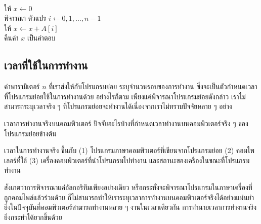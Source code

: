 \begin{algt}
\label{alg:array-sum2}
\\
\hspace*{0.2in} ให้ $x\leftarrow 0$\\
\hspace*{0.2in} พิจารณา ตัวแปร $i\leftarrow 0,1,\ldots,n-1$\\
\hspace*{0.2in}\hspace*{0.2in} ให้ $x \leftarrow x + A[i]$\\
\hspace*{0.2in} คืน{\wbr}ค่า $x$ เป็น{\wbr}คำตอบ{\wbr}
\end{algt}

\subsection{เวลา{\wbr}ที่{\wbr}ใช้{\wbr}ใน{\wbr}การ{\wbr}ทำงาน}

ค่า{\wbr}พารามิเตอร์ $n$ ที่{\wbr}เรา{\wbr}ส่ง{\wbr}ให้{\wbr}กับ{\wbr}โปรแกรมย่อย ระบุ{\wbr}จำนวน{\wbr}รอบ{\wbr}ของ{\wbr}การ{\wbr}ทำงาน{\wbr}
ซึ่ง{\wbr}จะ{\wbr}เป็น{\wbr}ตัวกำหนด{\wbr}เวลา{\wbr}ที่{\wbr}โปรแกรมย่อย{\wbr}ใช้{\wbr}ใน{\wbr}การ{\wbr}ทำงาน{\wbr}ด้วย อย่างไรก็ตาม{\wbr}
เพียงแค่{\wbr}พิจารณา{\wbr}โปรแกรมย่อย{\wbr}ดังกล่าว เรา{\wbr}ไม่{\wbr}สามารถ{\wbr}ระบุ{\wbr}เวลาจริง ๆ
ที่{\wbr}โปรแกรมย่อย{\wbr}จะ{\wbr}ทำงาน{\wbr}ได้{\wbr}เนื่องจาก{\wbr}เรา{\wbr}ไม่{\wbr}ทราบ{\wbr}ปัจจัย{\wbr}หลาย ๆ อย่าง{\wbr}

\begin{quiz}{เวลา{\wbr}การ{\wbr}ทำงาน{\wbr}จริง{\wbr}บน{\wbr}คอมพิวเตอร์}
ปัจจัย{\wbr}อะไร{\wbr}บ้าง{\wbr}ที่{\wbr}กำหนด{\wbr}เวลา{\wbr}ทำงาน{\wbr}บน{\wbr}คอมพิวเตอร์{\wbr}จริง ๆ ของ{\wbr}โปรแกรมย่อย{\wbr}ข้างต้น{\wbr}
\end{quiz}
\begin{quizans}
เวลา{\wbr}ใน{\wbr}การ{\wbr}ทำงาน{\wbr}จริง ขึ้น{\wbr}กับ (1) โปรแกรม{\wbr}ภาษาคอมพิวเตอร์{\wbr}ที่{\wbr}เขียน{\wbr}จาก{\wbr}โปรแกรมย่อย (2)
คอม{\wbr}ไพ{\wbr}เลอร์{\wbr}ที่{\wbr}ใช้ (3) เครื่อง{\wbr}คอมพิวเตอร์{\wbr}ที่{\wbr}นำ{\wbr}โปรแกรม{\wbr}ไป{\wbr}ทำงาน{\wbr}
และ{\wbr}สถานะ{\wbr}ของ{\wbr}เครื่องใน{\wbr}ขณะที่{\wbr}โปรแกรม{\wbr}ทำงาน  
\end{quizans}

สังเกต{\wbr}ว่า{\wbr}การ{\wbr}พิจารณา{\wbr}แค่{\wbr}อัล{\wbr}กอ{\wbr}ริ{\wbr}ทึม{\wbr}เพียง{\wbr}อย่างเดียว{\wbr}
หรือ{\wbr}กระทั่ง{\wbr}จะ{\wbr}พิจารณา{\wbr}โปรแกรม{\wbr}ใน{\wbr}ภาษาเครื่อง{\wbr}ที่{\wbr}ถูก{\wbr}คอมไพล์{\wbr}แล้ว{\wbr}ร่วม{\wbr}ด้วย{\wbr}
ก็{\wbr}ไม่{\wbr}สามารถ{\wbr}ทำ{\wbr}ให้{\wbr}เรา{\wbr}ระบุ{\wbr}เวลา{\wbr}การ{\wbr}ทำงาน{\wbr}บน{\wbr}คอมพิวเตอร์{\wbr}จริง{\wbr}ได้{\wbr}อย่าง{\wbr}แม่นยำ{\wbr}
ยิ่ง{\wbr}ใน{\wbr}ปัจจุบัน{\wbr}ที่{\wbr}คอมพิวเตอร์{\wbr}สามารถ{\wbr}ทำงาน{\wbr}หลาย ๆ งาน{\wbr}ใน{\wbr}เวลา{\wbr}เดียวกัน{\wbr}
การ{\wbr}ทำนาย{\wbr}เวลา{\wbr}การ{\wbr}ทำงาน{\wbr}จริง{\wbr}ยิ่ง{\wbr}กระทำ{\wbr}ได้{\wbr}ยาก{\wbr}ขึ้น{\wbr}ด้วย{\wbr}

